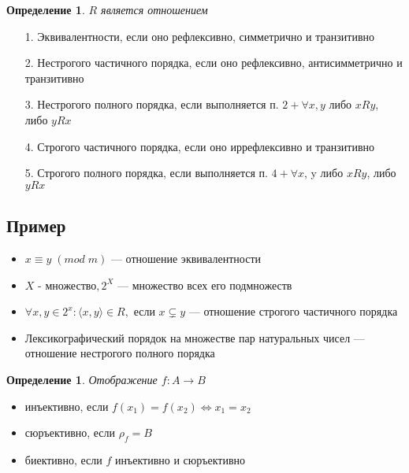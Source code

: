 \documentclass[12pt,letterpaper]{report}
\newtheorem{conj}[theorem]{Определение}
\begin{document}
\begin{conj}
    $R$ является отношением
\end{conj}
\begin{itemize}
    \item[1.] Эквивалентности, если оно рефлексивно, симметрично и транзитивно
    \item[2.] Нестрогого частичного порядка, если оно рефлексивно, антисимметрично и транзитивно
    \item[3.] Нестрогого полного порядка, если выполняется п. $2 + \forall x, y$ либо $xRy$, либо $yRx$
    \item[4.] Строгого частичного порядка, если оно иррефлексивно и транзитивно
    \item[5.] Строгого полного порядка, если выполняется п. $4 + \forall x$, y либо $xRy$, либо $yRx$
\end{itemize}

\subsection*{Пример}
\begin{itemize}
    \item $x \equiv y \; (mod \; m)$ — отношение эквивалентности
    \item $X$ - множество$, 2^X$ — множество всех его подмножеств
    \item $\forall x, y \in 2^x : \langle x, y \rangle \in R, $ если $ x \subsetneq y$ — отношение строгого частичного порядка
    \item Лексикографический порядок на множестве пар натуральных чисел — отношение нестрогого полного порядка
\end{itemize}

\begin{conj}
    Отображение $f: A  \longrightarrow B$ 
\end{conj}
\begin{itemize}
    \item инъективно, если $f(x_1) = f(x_2) \Leftrightarrow x_1 = x_2$
    \item сюръективно, если $\rho_f = B$
    \item биективно, если $f$ инъективно и сюръективно
\end{itemize}
\end{document}
